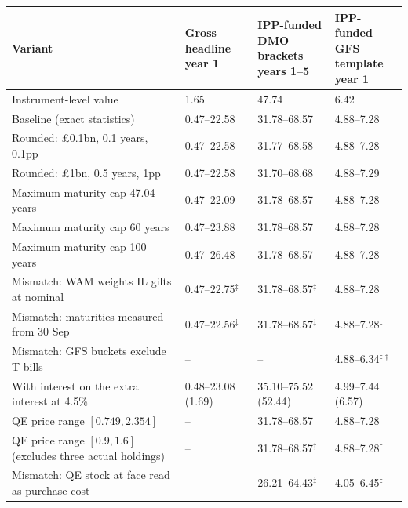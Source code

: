 \begin{tabular}{p{}lll}
\toprule
Variant & \shortstack[l]{Gross\\headline\\year 1} & \shortstack[l]{IPP-funded\\DMO brackets\\years 1--5} & \shortstack[l]{IPP-funded\\GFS template\\year 1} \\
\midrule
Instrument-level value & 1.65 & 47.74 & 6.42 \\
Baseline (exact statistics) & 0.47--22.58 & 31.78--68.57 & 4.88--7.28 \\
Rounded: \pounds0.1bn, 0.1 years, 0.1pp & 0.47--22.58 & 31.77--68.58 & 4.88--7.28 \\
Rounded: \pounds1bn, 0.5 years, 1pp & 0.47--22.58 & 31.70--68.68 & 4.88--7.29 \\
Maximum maturity cap 47.04 years & 0.47--22.09 & 31.78--68.57 & 4.88--7.28 \\
Maximum maturity cap 60 years & 0.47--23.88 & 31.78--68.57 & 4.88--7.28 \\
Maximum maturity cap 100 years & 0.47--26.48 & 31.78--68.57 & 4.88--7.28 \\
Mismatch: WAM weights IL gilts at nominal & 0.47--22.75$^\ddagger$ & 31.78--68.57$^\ddagger$ & 4.88--7.28 \\
Mismatch: maturities measured from 30 Sep & 0.47--22.56$^\ddagger$ & 31.78--68.57$^\ddagger$ & 4.88--7.28$^\ddagger$ \\
Mismatch: GFS buckets exclude T-bills & -- & -- & 4.88--6.34$^{\ddagger\dagger}$ \\
With interest on the extra interest at 4.5\% & 0.48--23.08 (1.69) & 35.10--75.52 (52.44) & 4.99--7.44 (6.57) \\
QE price range $[0.749, 2.354]$ & -- & 31.78--68.57 & 4.88--7.28 \\
QE price range $[0.9, 1.6]$ (excludes three actual holdings) & -- & 31.78--68.57$^\ddagger$ & 4.88--7.28$^\ddagger$ \\
Mismatch: QE stock at face read as purchase cost & -- & 26.21--64.43$^\ddagger$ & 4.05--6.45$^\ddagger$ \\
\bottomrule
\end{tabular}
